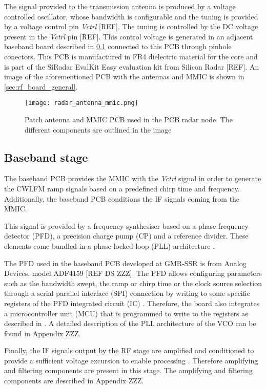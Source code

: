 The signal provided to the transmission antenna is produced by a voltage controlled oscillator, whose bandwidth is configurable and the tuning is provided by a voltage control pin \textit{Vctrl} [REF]. The tuning is controlled by the DC voltage present in the \textit{Vctrl} pin [REF]. This control voltage is generated in an adjacent baseband board described in \cref{sec:baseband_general} connected to this PCB through pinhole conectors. This PCB is manufactured in FR4 dielectric material for the core and is part of the SiRadar EvalKit Easy evaluation kit from Silicon Radar [REF]. An image of the aforementioned PCB with the antennas and MMIC is shown in  \cref{sec:rf_board_general}.

\begin{figure}[ht]
	\centering
	\texttt{[image: radar\_antenna\_mmic.png]}
	\caption{Patch antenna and MMIC PCB used in the PCB radar node. The different components are outlined in the image \label{fig:rf_board_general}}
\end{figure}

\subsection{Baseband stage} \label{sec:baseband_general}

The baseband PCB provides the MMIC with the \textit{Vctrl} signal in order to generate the CWLFM ramp signals based on a predefined chirp time and frequency. Additionally, the baseband PCB conditions the IF signals coming from the MMIC.

This signal is provided by a frequency synthesiser based on a phase frequency detector (PFD), a precision charge pump (CP) and a reference divider. These elements come bundled in a phase-locked loop (PLL) architecture \cite{Sardinero2022}.

The PFD used in the baseband PCB developed at GMR-SSR is from Analog Devices, model ADF4159 [REF DS ZZZ]. The PFD allows configuring parameters such as the bandwidth swept, the ramp or chirp time or the clock source selection through a serial parallel interface (SPI) connection by writing to some specific registers of the PFD integrated circuit (IC) \cite{Sardinero2022, ZZZ}. Therefore, the board also integrates a microcontroller unit (MCU) that is programmed to write to the registers as described in \cite{Sardinero2022}. A detailed description of the PLL architecture of the VCO can be found in Appendix ZZZ.

Finally, the IF signals output by the RF stage are amplified and conditioned to provide a sufficient voltage excursion to enable processing \cite{Sardinero2022}. Therefore amplifying and filtering components are present in this stage. The amplifying and filtering components are described in Appendix ZZZ.

